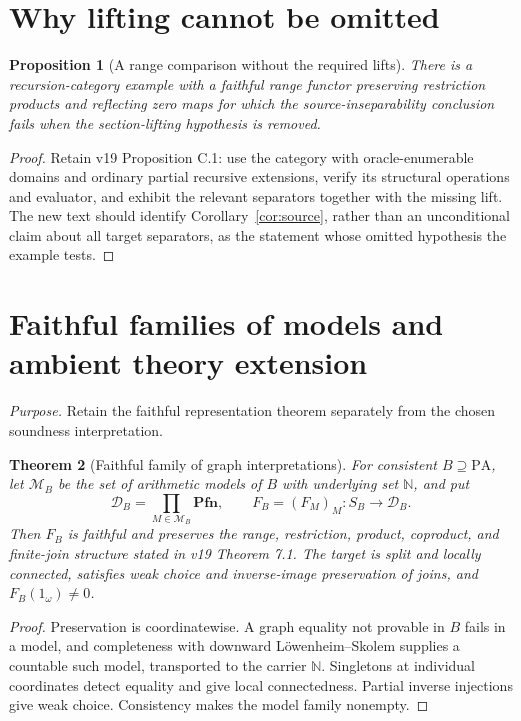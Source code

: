 \documentclass[11pt]{article}
\newtheorem{theorem}{Theorem}[section]
\newtheorem{proposition}[theorem]{Proposition}
\theoremstyle{definition}\newtheorem{definition}[theorem]{Definition}
\newcommand{\PA}{\mathrm{PA}}
\newcommand{\N}{\mathbb N}
\newcommand{\Pfn}{\mathbf{Pfn}}
\newcommand{\D}{\mathcal D}
\newcommand{\purpose}[1]{\noindent\textit{Purpose.} #1\par\medskip}
\begin{document}
\section{Why lifting cannot be omitted}
\begin{proposition}[A range comparison without the required lifts]
There is a recursion-category example with a faithful range functor
preserving restriction products and reflecting zero maps for which
the source-inseparability conclusion fails when the section-lifting
hypothesis is removed.
\end{proposition}
\begin{proof}
Retain v19 Proposition C.1: use the category with oracle-enumerable
domains and ordinary partial recursive extensions, verify its
structural operations and evaluator, and exhibit the relevant
separators together with the missing lift. The new text should
identify Corollary~\ref{cor:source}, rather than an unconditional
claim about all target separators, as the statement whose omitted
hypothesis the example tests.
\end{proof}

\section{Faithful families of models and ambient theory extension}
\purpose{Retain the faithful representation theorem separately from the chosen soundness interpretation.}

\begin{theorem}[Faithful family of graph interpretations]
For consistent $B\supseteq\PA$, let $\mathcal M_B$ be the set
of arithmetic models of $B$ with underlying set $\N$, and put
\[
 \D_B=\prod_{M\in\mathcal M_B}\Pfn,
 \qquad F_B=(F_M)_M:S_B\to\D_B.
\]
Then $F_B$ is faithful and preserves the range, restriction,
product, coproduct, and finite-join structure stated in v19
Theorem 7.1. The target is split and locally connected, satisfies
weak choice and inverse-image preservation of joins, and
$F_B(1_\omega)\ne0$.
\end{theorem}
\begin{proof}
Preservation is coordinatewise. A graph equality not provable in
$B$ fails in a model, and completeness with downward
L\"owenheim--Skolem supplies a countable such model, transported
to the carrier $\N$. Singletons at individual coordinates detect
equality and give local connectedness. Partial inverse injections
give weak choice. Consistency makes the model family nonempty.
\end{proof}
\end{document}
